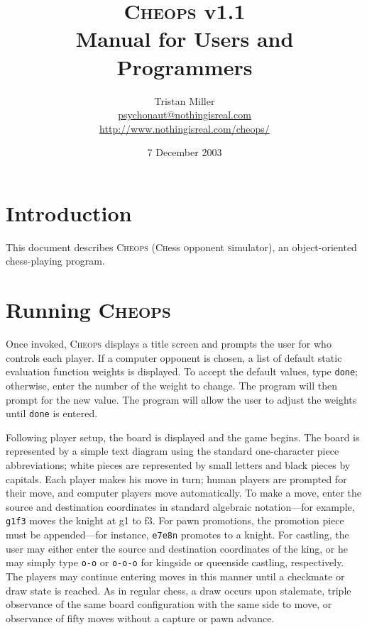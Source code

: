 \documentclass[a4paper]{article}
\begin{document}
\title{\textsc{Cheops} v1.1\\Manual for Users and Programmers}
\author{Tristan Miller\\ \url{psychonaut@nothingisreal.com}\\ 
  \url{http://www.nothingisreal.com/cheops/}}
\date{7 December 2003}
\maketitle

\section{Introduction}

This document describes \textsc{Cheops} (\textsc{Ch}ess
\textsc{o}pponent \textsc{s}imulator), an object-oriented
chess-playing program.

\section{Running \textsc{Cheops}}

Once invoked, \textsc{Cheops} displays a title screen and prompts the
user for who controls each player. If a computer opponent is chosen, a
list of default static evaluation function weights is displayed.  To
accept the default values, type \texttt{done}; otherwise, enter the
number of the weight to change. The program will then prompt for the
new value.  The program will allow the user to adjust the weights
until \texttt{done} is entered.

Following player setup, the board is displayed and the game begins.
The board is represented by a simple text diagram using the standard
one-character piece abbreviations; white pieces are represented by
small letters and black pieces by capitals.  Each player makes his
move in turn; human players are prompted for their move, and computer
players move automatically. To make a move, enter the source and
destination coordinates in standard algebraic notation---for example,
\texttt{g1f3} moves the knight at g1 to f3.  For pawn promotions, the
promotion piece must be appended---for instance, \texttt{e7e8n}
promotes to a knight. For castling, the user may either enter the
source and destination coordinates of the king, or he may simply type
\texttt{o-o} or \texttt{o-o-o} for kingside or queenside castling,
respectively. The players may continue entering moves in this manner
until a checkmate or draw state is reached. As in regular chess, a
draw occurs upon stalemate, triple observance of the same board
configuration with the same side to move, or observance of fifty moves
without a capture or pawn advance.
\end{document}

